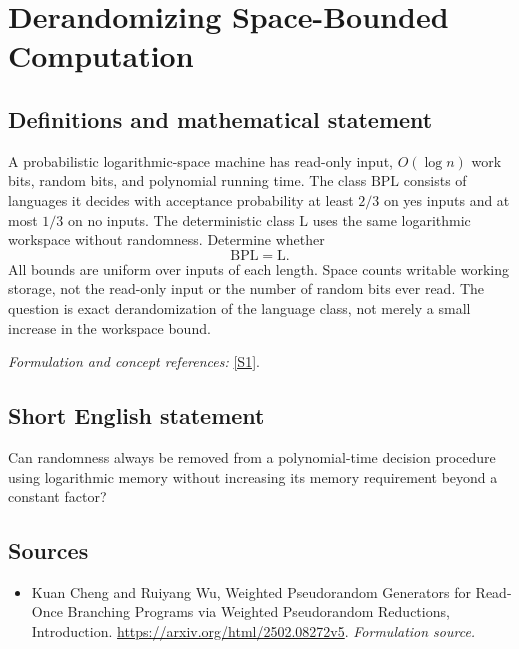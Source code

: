 \documentclass[11pt]{article}
\begin{document}
\section*{\texorpdfstring{Derandomizing Space-Bounded Computation}{Derandomizing Space-Bounded Computation}}\label{30004922}
\subsection{Definitions and mathematical statement}
A probabilistic logarithmic-space machine has read-only input, $O(\log n)$ work bits, random bits, and polynomial running time. The class $\mathrm{BPL}$ consists of languages it decides with acceptance probability at least $2/3$ on yes inputs and at most $1/3$ on no inputs. The deterministic class $\mathrm L$ uses the same logarithmic workspace without randomness. Determine whether
\[
 \mathrm{BPL}=\mathrm L.
\]
All bounds are uniform over inputs of each length. Space counts writable working storage, not the read-only input or the number of random bits ever read. The question is exact derandomization of the language class, not merely a small increase in the workspace bound.
\par\smallskip\textit{Formulation and concept references:} \href{https://arxiv.org/html/2502.08272v5}{[S1]}.

\subsection{Short English statement}
Can randomness always be removed from a polynomial-time decision procedure using logarithmic memory without increasing its memory requirement beyond a constant factor?
\subsection{Sources}
\begin{itemize}
\item[S1]Kuan Cheng and Ruiyang Wu, Weighted Pseudorandom Generators for Read-Once Branching Programs via Weighted Pseudorandom Reductions, Introduction.
\url{https://arxiv.org/html/2502.08272v5}.
\textit{Formulation source.}
\end{itemize}
\end{document}
